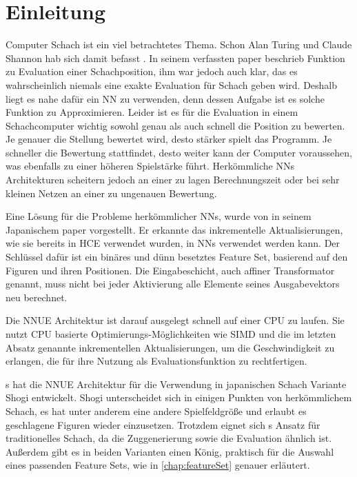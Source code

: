 \chapter{Einleitung}

Computer Schach ist ein viel betrachtetes Thema. Schon Alan Turing und Claude Shannon hab sich damit befasst \cite{Turing1953, Shannon1950}. In seinem \citeyear{Shannon1950} verfassten paper beschrieb \citeauthor{Shannon1950} \cite{Shannon1950} Funktion zu Evaluation einer Schachposition, ihm war jedoch auch klar, das es wahrscheinlich niemals eine exakte Evaluation für Schach geben wird. Deshalb liegt es nahe dafür ein \ac{NN} zu verwenden, denn dessen Aufgabe ist es solche Funktion zu Approximieren. Leider ist es für die Evaluation in einem Schachcomputer wichtig sowohl genau als auch schnell die Position zu bewerten. Je genauer die Stellung bewertet wird, desto stärker spielt das Programm. Je schneller die Bewertung stattfindet, desto weiter kann der Computer voraussehen, was ebenfalls zu einer höheren Spielstärke führt. Herkömmliche \acp{NN} Architekturen scheitern jedoch an einer zu lagen Berechnungszeit oder bei sehr kleinen Netzen an einer zu ungenauen Bewertung.

Eine Lösung für die Probleme herkömmlicher \acp{NN}, wurde \citeyear{YNasu2018} von \citeauthor{YNasu2018} \cite{YNasu2018} in seinem Japanischem paper vorgestellt. Er erkannte das inkrementelle Aktualisierungen, wie sie bereits in \ac{HCE} verwendet wurden, in \acp{NN} verwendet werden kann. Der Schlüssel dafür ist ein binäres und dünn besetztes Feature Set, basierend auf den Figuren und ihren Positionen. Die Eingabeschicht, auch affiner Transformator genannt, muss nicht bei jeder Aktivierung alle Elemente seines Ausgabevektors neu berechnet.

Die \ac{NNUE} Architektur ist darauf ausgelegt schnell auf einer CPU zu laufen. Sie nutzt CPU basierte Optimierungs-Möglichkeiten wie \ac{SIMD} und die im letzten Absatz genannte inkrementellen Aktualisierungen, um die Geschwindigkeit zu erlangen, die für ihre Nutzung als Evaluationsfunktion zu rechtfertigen.

\citeauthor{YNasu2018}s \cite{YNasu2018} hat die \ac{NNUE} Architektur für die Verwendung in japanischen Schach Variante Shogi entwickelt. Shogi unterscheidet sich in einigen Punkten von herkömmlichem Schach, es hat unter anderem eine andere Spielfeldgröße und erlaubt es geschlagene Figuren wieder einzusetzen. Trotzdem eignet sich \citeauthor{YNasu2018}s \cite{YNasu2018} Ansatz für traditionelles Schach, da die Zuggenerierung sowie die Evaluation ähnlich ist. Außerdem gibt es in beiden Varianten einen König, praktisch für die Auswahl eines passenden Feature Sets, wie in \autoref{chap:featureSet} genauer erläutert.

